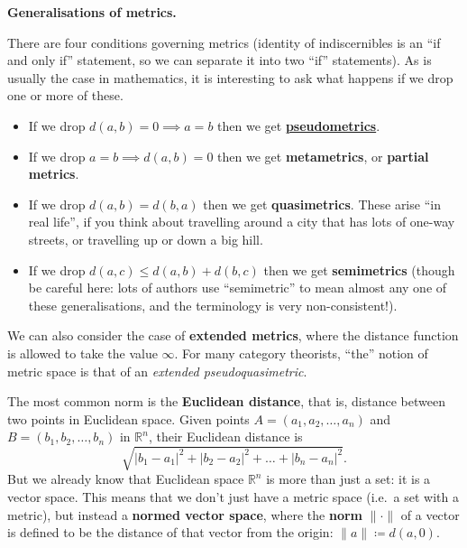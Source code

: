 \documentclass[fleqn,a4paper]{article}
\providecommand{\tightlist}{\setlength{\itemsep}{0pt}\setlength{\parskip}{0pt}}
\newenvironment{technical}[1]{\textbf{#1.}\par\vspace{.5\baselineskip}\everypar{\setlength{\parindent}{1.5em}}}{}
\theoremstyle{definition}
\theoremstyle{definition}
\theoremstyle{definition}
\theoremstyle{definition}
\theoremstyle{remark}
\begin{document}
\begin{technical}{Generalisations of metrics}
There are four conditions governing metrics (identity of indiscernibles is an ``if and only if'' statement, so we can separate it into two ``if'' statements).
As is usually the case in mathematics, it is interesting to ask what happens if we drop one or more of these.

\begin{itemize}
\tightlist
\item
  If we drop \(d(a,b)=0\implies a=b\) then we get \href{https://en.wikipedia.org/wiki/Pseudometric_space}{\textbf{pseudometrics}}.
\item
  If we drop \(a=b\implies d(a,b)=0\) then we get \textbf{metametrics}, or \textbf{partial metrics}.
\item
  If we drop \(d(a,b)=d(b,a)\) then we get \textbf{quasimetrics}. These arise ``in real life'', if you think about travelling around a city that has lots of one-way streets, or travelling up or down a big hill.
\item
  If we drop \(d(a,c)\leqslant d(a,b)+d(b,c)\) then we get \textbf{semimetrics} (though be careful here: lots of authors use ``semimetric'' to mean almost any one of these generalisations, and the terminology is very non-consistent!).
\end{itemize}

We can also consider the case of \textbf{extended metrics}, where the distance function is allowed to take the value \(\infty\).
For many category theorists, ``the'' notion of metric space is that of an \emph{extended pseudoquasimetric}.

\end{technical}

The most common norm is the \textbf{Euclidean distance}, that is, distance between two points in Euclidean space.
Given points \(A=(a_1,a_2,\ldots,a_n)\) and \(B=(b_1,b_2,\ldots,b_n)\) in \(\mathbb{R}^n\), their Euclidean distance is
\[
 \sqrt{|b_1-a_1|^2 + |b_2-a_2|^2+\ldots +|b_n-a_n|^2}.
\]
But we already know that Euclidean space \(\mathbb{R}^n\) is more than just a set: it is a vector space.
This means that we don't just have a metric space (i.e.~a set with a metric), but instead a \textbf{normed vector space}, where the \textbf{norm} \(\|\cdot\|\) of a vector is defined to be the distance of that vector from the origin: \(\|a\|\coloneqq d(a,0)\).
\end{document}
